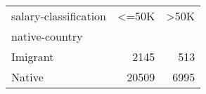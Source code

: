 \begin{tabular}{lrr}
\toprule
salary-classification &   <=50K &   >50K \\
native-country &         &        \\
\midrule
Imigrant       &    2145 &    513 \\
Native         &   20509 &   6995 \\
\bottomrule
\end{tabular}
